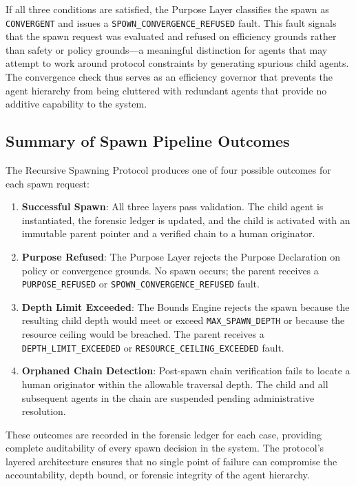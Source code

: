 If all three conditions are satisfied, the Purpose Layer classifies the spawn as \texttt{CONVERGENT} and issues a \texttt{SPOWN\_CONVERGENCE\_REFUSED} fault. This fault signals that the spawn request was evaluated and refused on efficiency grounds rather than safety or policy grounds—a meaningful distinction for agents that may attempt to work around protocol constraints by generating spurious child agents. The convergence check thus serves as an efficiency governor that prevents the agent hierarchy from being cluttered with redundant agents that provide no additive capability to the system.

\subsection{Summary of Spawn Pipeline Outcomes}

The Recursive Spawning Protocol produces one of four possible outcomes for each spawn request:

\begin{enumerate}
\item \textbf{Successful Spawn}: All three layers pass validation. The child agent is instantiated, the forensic ledger is updated, and the child is activated with an immutable parent pointer and a verified chain to a human originator.
\item \textbf{Purpose Refused}: The Purpose Layer rejects the Purpose Declaration on policy or convergence grounds. No spawn occurs; the parent receives a \texttt{PURPOSE\_REFUSED} or \texttt{SPOWN\_CONVERGENCE\_REFUSED} fault.
\item \textbf{Depth Limit Exceeded}: The Bounds Engine rejects the spawn because the resulting child depth would meet or exceed \texttt{MAX\_SPAWN\_DEPTH} or because the resource ceiling would be breached. The parent receives a \texttt{DEPTH\_LIMIT\_EXCEEDED} or \texttt{RESOURCE\_CEILING\_EXCEEDED} fault.
\item \textbf{Orphaned Chain Detection}: Post-spawn chain verification fails to locate a human originator within the allowable traversal depth. The child and all subsequent agents in the chain are suspended pending administrative resolution.
\end{enumerate}

These outcomes are recorded in the forensic ledger for each case, providing complete auditability of every spawn decision in the system. The protocol's layered architecture ensures that no single point of failure can compromise the accountability, depth bound, or forensic integrity of the agent hierarchy.

